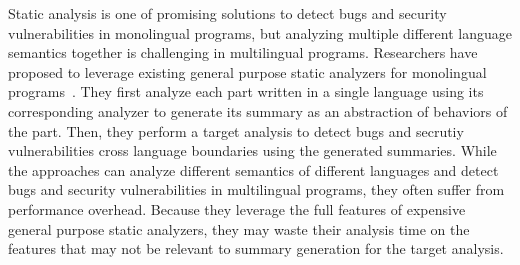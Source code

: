 Static analysis is one of promising solutions to detect bugs and security
vulnerabilities in monolingual programs, but analyzing multiple different
language semantics together is challenging in multilingual programs.
Researchers have proposed to leverage existing general purpose static analyzers
for monolingual programs~\cite{JN-SAF, LeeASE20}. They first analyze each part
written in a single language using its corresponding analyzer to generate its
summary as an abstraction of behaviors of the part. Then, they perform a target
analysis to detect bugs and secrutiy vulnerabilities cross language boundaries
using the generated summaries. While the approaches can analyze different
semantics of different languages and detect bugs and security vulnerabilities
in multilingual programs, they often suffer from performance overhead. Because
they leverage the full features of expensive general purpose static analyzers,
they may waste their analysis time on the features that may not be relevant to
summary generation for the target analysis.


%

